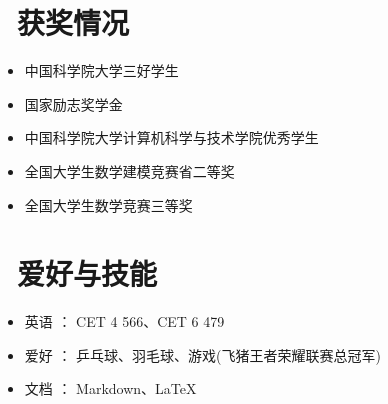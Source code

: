 \documentclass{resume}
\begin{document}

\section{\faHeartO\ 获奖情况}
\begin{itemize}[parsep=0.5ex]
  \item 中国科学院大学三好学生
  \item 国家励志奖学金
  \item 中国科学院大学计算机科学与技术学院优秀学生
  \item 全国大学生数学建模竞赛省二等奖
  \item 全国大学生数学竞赛三等奖
\end{itemize}

\section{\faCogs\ 爱好与技能}
\begin{itemize}[parsep=0.5ex]
  \item 英语 ：		   CET 4 566、CET 6 479
  \item 爱好 ：		   乒乓球、羽毛球、游戏(飞猪王者荣耀联赛总冠军)
  \item 文档 ：		   Markdown、\LaTeX
\end{itemize}



%
%
\end{document}
